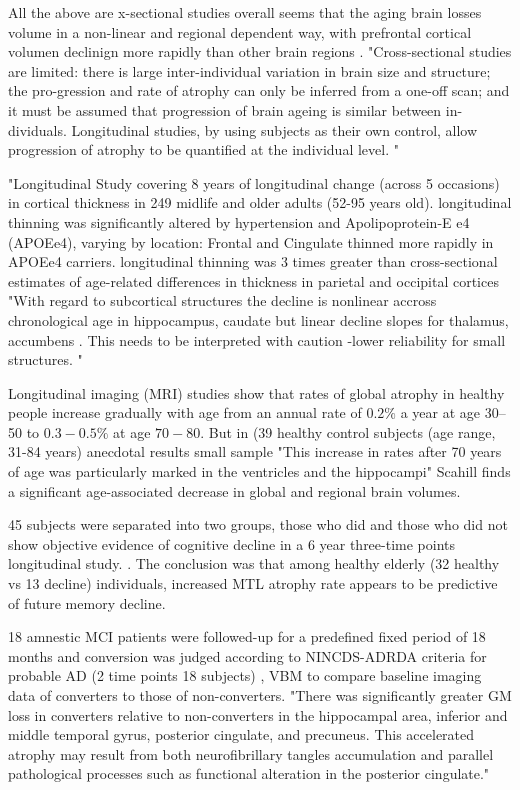 \documentclass[twoside,onecolumn]{article}
\begin{document}
All the above are x-sectional studies overall seems that the aging brain losses volume in a non-linear and  regional dependent way, with prefrontal cortical volumen declinign more rapidly than other brain regions \cite{thompson2003dynamics}.
"Cross-sectional studies are limited: there is large inter-individual variation in brain size and structure; the pro-gression and rate of atrophy can only be inferred from a one-off scan; and it must be assumed that progression of brain ageing is similar between in- dividuals. Longitudinal studies, by using subjects as their own control, allow progression of atrophy to be quantified at the individual level. "

"Longitudinal Study covering 8 years of longitudinal change (across 5 occasions) in cortical thickness in 249 midlife  and older adults (52-95 years old). longitudinal thinning was significantly altered by hypertension and Apolipoprotein-E e4 (APOEe4), varying by location: Frontal and Cingulate thinned more rapidly in APOEe4 carriers.  longitudinal thinning was 3 times greater than cross-sectional estimates of age-related differences in thickness in parietal and occipital cortices\cite{rast2017apoevarepsilon4}
"With regard to subcortical structures the decline is nonlinear accross chronological age in hippocampus, caudate but linear decline slopes for thalamus, accumbens \cite{fjell2010structural}. This needs to be interpreted with caution -lower reliability for small structures. " 

Longitudinal imaging (MRI) studies show that rates of global atrophy in healthy people increase gradually with age from an annual rate of $0.2\%$ a year at age 30–50 to $0.3-0.5\%$ at age $70-80$. But in  \cite{scahill2003longitudinal} (39 healthy control subjects (age range, 31-84 years) anecdotal results small sample "This increase in rates after 70 years of age was particularly marked in the ventricles  and the hippocampi" Scahill finds a significant age-associated decrease in global and regional brain volumes.

45 subjects were separated into two groups, those who did and those who did not show objective evidence of cognitive decline in a 6 year three-time points longitudinal study. \cite{rusinek2003regional}. The conclusion was that among healthy elderly (32 healthy vs 13 decline) individuals, increased MTL atrophy rate appears to be predictive of future memory decline.

18 amnestic MCI patients were followed-up for a predefined fixed period of 18 months and conversion was judged according to NINCDS-ADRDA criteria for probable AD (2 time points 18 subjects) \cite{chetelat2005using}, VBM to compare baseline imaging data of converters to those of non-converters. "There was significantly greater GM loss in converters relative to non-converters in the hippocampal area, inferior and middle temporal gyrus, posterior cingulate, and precuneus. This accelerated atrophy may result from both neurofibrillary tangles accumulation and parallel pathological processes such as functional alteration in the posterior cingulate."
\end{document}
